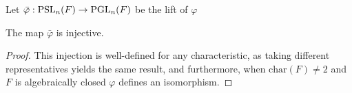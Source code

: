 \begin{definition}
    Let $\bar{\varphi} : \operatorname{PSL}_n(F) \rightarrow \operatorname{PGL}_n(F)$ be the lift of $\varphi$
\end{definition}

\begin{lemma}
    The map $\bar{\varphi}$ is injective.
\end{lemma}


\begin{proof}

This injection is well-defined for any characteristic, as taking different representatives yields the same result, and furthermore, when $\textrm{char}(F) \ne 2$ and $F$ is algebraically closed $\varphi$ defines an isomorphism.

\end{proof}



